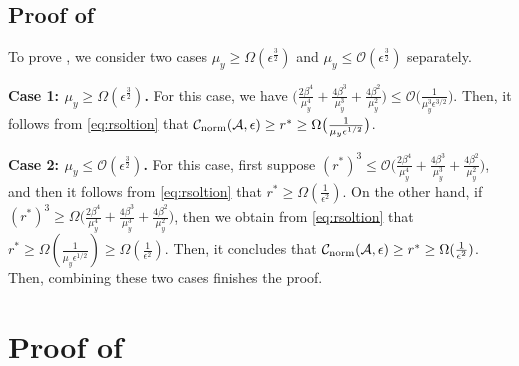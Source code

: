 \documentclass{osudissert96}
\begin{document}
\section{Proof of }
To prove  , we consider two cases $\mu_y\geq \Omega(\epsilon^{\frac{3}{2}})$ and $\mu_y\leq \mathcal{O}(\epsilon^{\frac{3}{2}})$ separately. 

{\bf Case 1: $\mu_y\geq \Omega(\epsilon^{\frac{3}{2}})$.} For this case, we have 
$\big(\frac{2\beta^4}{\mu_y^4}+\frac{4\beta^3}{\mu_y^3}+\frac{4\beta^2}{\mu_y^2}\big)\leq \mathcal{O}\big(\frac{1}{\mu_y^{3}\epsilon^{3/2}}\big)$. Then, it follows from \cref{eq:rsoltion} that $\mathcal{C}_{\text{\normalfont norm}}(\mathcal{A},\epsilon) \geq r^*\geq \Omega \big(\frac{1}{\mu_y\epsilon^{1/2}}\big)$. 

{\bf Case 2: $\mu_y\leq \mathcal{O}(\epsilon^{\frac{3}{2}})$.} For this case, first suppose $(r^*)^3\leq  \mathcal{O}\big(\frac{2\beta^4}{\mu_y^4}+\frac{4\beta^3}{\mu_y^3}+\frac{4\beta^2}{\mu_y^2}\big) $, and then it follows from \cref{eq:rsoltion}  that $r^* \geq \Omega(\frac{1}{\epsilon^{2}}) $. On the other hand, if $(r^*)^3\geq  \Omega\big(\frac{2\beta^4}{\mu_y^4}+\frac{4\beta^3}{\mu_y^3}+\frac{4\beta^2}{\mu_y^2}\big) $, then we obtain from \cref{eq:rsoltion}  that $r^*\geq \Omega(\frac{1}{\mu_y\epsilon^{1/2}})\geq \Omega(\frac{1}{\epsilon^{2}})$. Then, it concludes that $\mathcal{C}_{\text{\normalfont norm}}(\mathcal{A},\epsilon)\geq r^*\geq \Omega(\frac{1}{\epsilon^{2}})$.
Then, combining these two cases finishes the proof. 

\chapter{Proof of }\label{appendix:stoc_bilevel}
\end{document}
